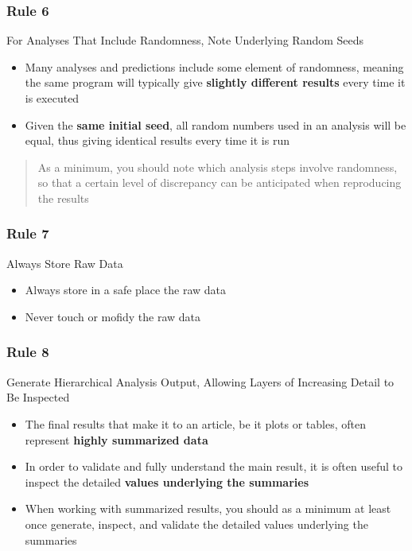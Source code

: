 \documentclass{beamer}
\begin{document}
\begin{frame}
\frametitle{Rule 6}
{\sc For Analyses That Include Randomness, Note Underlying Random Seeds}
\pause
\begin{itemize}
	\item Many analyses and predictions include some element of randomness, meaning the same program will typically give \textbf{slightly different results} every time it is executed
	\item Given the \textbf{same initial seed}, all random numbers used in an analysis will be equal, thus giving identical results every time it is run
\end{itemize}
\begin{quote}
    As a minimum, you should note which analysis steps involve randomness, so that a certain level of discrepancy can be anticipated when reproducing the results
\end{quote}
\end{frame}
\begin{frame}
\frametitle{Rule 7}
{\sc Always Store Raw Data}\
\pause
\begin{itemize}
	\item {\sc Always} store in a safe place the raw data
	\item {\sc Never} touch or mofidy the raw data
\end{itemize}
\end{frame}
\begin{frame}
\frametitle{Rule 8}
{\sc Generate Hierarchical Analysis Output, Allowing Layers of Increasing Detail to Be Inspected}
\pause
\begin{itemize}
	\item The final results that make it to an article, be it plots or tables, often represent \textbf{highly summarized data}
    \item In order to validate and fully understand the main result, it is often useful to inspect the detailed \textbf{values underlying the summaries}
    \item When working with summarized results, you should as a minimum at least once generate, inspect, and validate the detailed values underlying the summaries
\end{itemize}

\end{frame}
\end{document}
